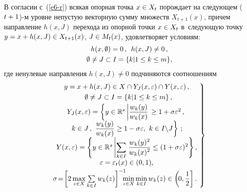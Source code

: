 \begin{multicols}{2}
  В согласии с~(\ref{e6-r}) всякая опорная точка $x\hm\in X_t$ порождает на 
следующем ($t\hm+1$)-м уровне не\-пус\-тую векторную сумму множеств 
$X_{t+1}(x)$, причем на\-прав\-ле\-ние $h(x,J)$ перехода из опорной точки 
$x\hm\in X_t$ в~следующую точку $y\hm= x\hm+ h(x,J)\hm\in X_{t+1}(x)$, 
$J\hm\in M_t(x)$, удовлетворяет условиям:
  \begin{multline}
  h(x,\emptyset) =0\,,\enskip h(x,J)\not= 0\,,\\
   \emptyset\not= J\subset I 
=\{k\vert 1\leq k\leq m\},
  \label{e7-r}
  \end{multline}
где ненулевые направления $h(x,J)\not= 0$ подчиняются соотношениям
\begin{equation}
\left.
\begin{array}{c}
\!\!\!y=x+h(x,J)\in X\cap Y_J(x,\varepsilon) \cap Y(x,\varepsilon)\,,\\[3pt]
\emptyset \not= J\subset I= \{k\vert 1\leq k\leq m\}\,,\\[3pt]
\!\!\!Y_J(x,\varepsilon) =\left\{ y\in \mathbb{R}^s \left\vert \fr{w_k(y)}{w_k(x)} \right. 
\geq 1+\sigma\varepsilon^2\,,\right.\\[3pt]
\!\!\!\left.k\in J\,,\ \fr{w_k(y)}{w_k(x)}\geq 1-\sigma\varepsilon,\ k\in I\backslash 
J\right\}\,;\\[3pt]
\!\!\!Y(x,\varepsilon) =\left\{ y\in \mathbb{R}^s\left\vert \displaystyle\sum\limits_{k\in I} \right. 
\fr{w_k(y)^2}{w_k(x)^2}\leq (1+\sigma\varepsilon)^2\right\},\\[4pt]
\!\!\!\varepsilon=\varepsilon_t(x)\in (0,1),\\[3pt]
\!\!\! \!\!\!\sigma \!=\!\left[ 2\max\limits_{z\in X} 
\sum\limits_{k\in I} w_k(z)\right]^{-1}  \!\!\!\!\min\limits_{z\in X} \min\limits_{k\in I} 
w_k(z)\in \left(\! 0, \fr{1}{2}\right].
\end{array}\!
\right\}\!\!
\label{e8-r}
\end{equation}
  

\end{multicols}
